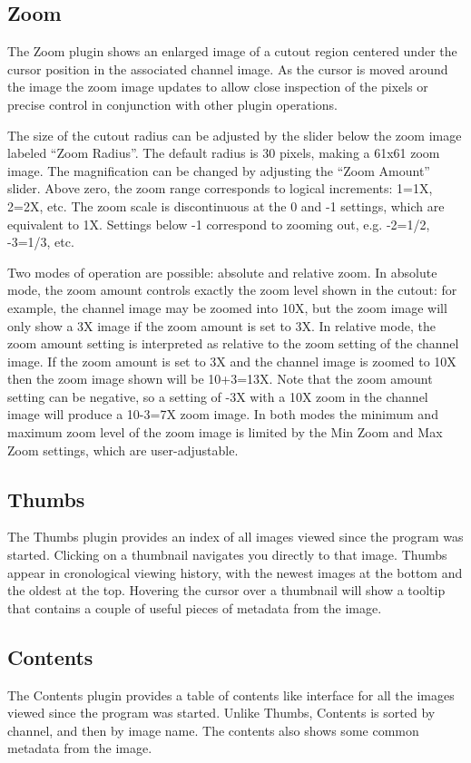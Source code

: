 \documentclass[11pt]{report}
\begin{document}
\subsection{Zoom}
The Zoom plugin shows an enlarged image of a cutout region centered
under the cursor position in the associated channel image.  As the
cursor is moved around the image the zoom image updates to allow close
inspection of the pixels or precise control in conjunction with other
plugin operations.

The size of the cutout radius can be adjusted by the slider below the
zoom image labeled ``Zoom Radius''. The default radius is 30 pixels,
making a 61x61 zoom image.  The magnification can be changed by
adjusting the ``Zoom Amount'' slider.
Above zero, the zoom range corresponds to logical increments: 1=1X,
2=2X, etc.  The zoom scale is discontinuous at the 0 and -1 settings,
which are equivalent to 1X.  Settings below -1 correspond to zooming out,
e.g. -2=1/2, -3=1/3, etc. 

Two modes of operation are possible: absolute and relative zoom.  In
absolute mode, the zoom amount controls exactly the zoom level shown in
the cutout: for example, the channel image may be zoomed into 10X, but
the zoom image will only show a 3X image if the zoom amount is set to
3X.
In relative mode, the zoom amount setting is interpreted as relative to
the zoom setting of the channel image.  If the zoom amount is set to 3X
and the channel image is zoomed to 10X then the zoom image shown will be
10+3=13X.  Note that the zoom amount setting can be negative, so a
setting of -3X with a 10X zoom in the channel image will produce a
10-3=7X zoom image.
In both modes the minimum and maximum zoom level of the zoom image is
limited by the Min Zoom and Max Zoom settings, which are
user-adjustable.  

\subsection{Thumbs}
The Thumbs plugin provides an index of all images viewed since the
program was started.  Clicking on a thumbnail navigates you directly to
that image.  Thumbs appear in cronological viewing history, with the
newest images at the bottom and the oldest at the top.  Hovering the
cursor over a thumbnail will show a tooltip that contains a couple of
useful pieces of metadata from the image.

\subsection{Contents}
The Contents plugin provides a table of contents like interface for all
the images viewed since the program was started.  Unlike Thumbs,
Contents is sorted by channel, and then by image name.  The contents
also shows some common metadata from the image.
\end{document}
